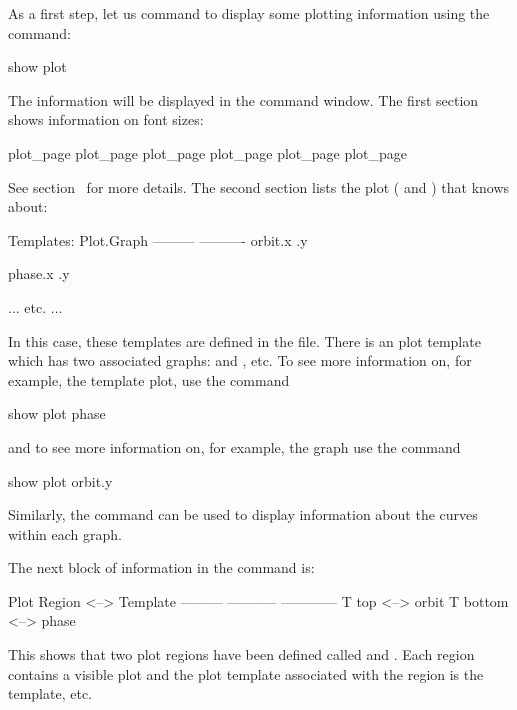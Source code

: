 As a first step, let us command \tao to display some plotting
information using the command:
\begin{example}
  show plot
\end{example}
The information will be displayed in the command window. The
first section shows information on font sizes:
\begin{example}
  plot_page%
  plot_page%
  plot_page%
  plot_page%
  plot_page%
  plot_page%
\end{example}
See section~ for more details. The second section
lists the plot  ( and
) that \tao knows about:
\begin{example}
 Templates:        Plot.Graph
              --------- ----------
                  orbit.x
                       .y
 
                  phase.x
                       .y

    ... etc. ...
\end{example}
In this case, these templates are defined in the 
file. There is an  plot template which has two associated
graphs:  and , etc. To see more information on, for example,
the  template plot, use the command
\begin{example}
  show plot phase
\end{example}
and to see more information on, for example, the  graph use the command
\begin{example}
  show plot orbit.y
\end{example}
Similarly, the  command can be used to display
information about the curves within each graph.

The next block of information in the  command is:
\begin{example}
  [Visible]     Plot Region         <-->  Template
  ---------     -----------               ------------
     T          top                 <-->  orbit
     T          bottom              <-->  phase
\end{example}
This shows that two plot regions have been defined called  and
. Each region contains a visible plot and the plot template
associated with the  region is the  template, etc.

